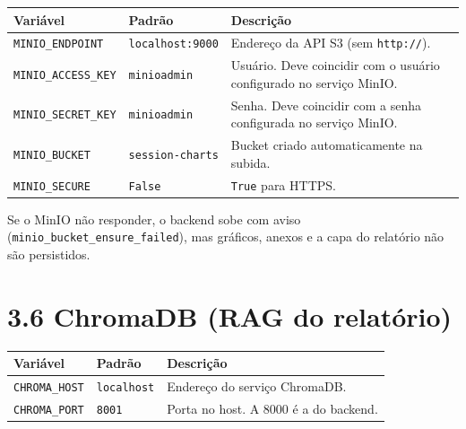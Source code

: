 \documentclass[
  brazilian,
  a4paper,12pt,oneside]{report}
\newcounter{none} %
\begin{document}
{\def\LTcaptype{none} %
\begin{longtable}[]{@{}
  >{\raggedright\arraybackslash}p{}
  >{\raggedright\arraybackslash}p{}
  >{\raggedright\arraybackslash}p{}@{}}
\toprule\noalign{}
\begin{minipage}[b]{\linewidth}\raggedright
Variável
\end{minipage} & \begin{minipage}[b]{\linewidth}\raggedright
Padrão
\end{minipage} & \begin{minipage}[b]{\linewidth}\raggedright
Descrição
\end{minipage} \\
\midrule\noalign{}
\endhead
\bottomrule\noalign{}
\endlastfoot
\texttt{MINIO\_}\allowbreak{}\texttt{ENDPOINT} &
\texttt{localhost:}\allowbreak{}\texttt{9000} & Endereço da API S3 (sem
\texttt{http:}\allowbreak{}\texttt{/}\allowbreak{}\texttt{/}). \\
\texttt{MINIO\_}\allowbreak{}\texttt{ACCESS\_}\allowbreak{}\texttt{KEY}
& \texttt{minioadmin} & Usuário. Deve coincidir com o usuário
configurado no serviço MinIO. \\
\texttt{MINIO\_}\allowbreak{}\texttt{SECRET\_}\allowbreak{}\texttt{KEY}
& \texttt{minioadmin} & Senha. Deve coincidir com a senha configurada no
serviço MinIO. \\
\texttt{MINIO\_}\allowbreak{}\texttt{BUCKET} &
\texttt{session-}\allowbreak{}\texttt{charts} & Bucket criado
automaticamente na subida. \\
\texttt{MINIO\_}\allowbreak{}\texttt{SECURE} & \texttt{False} &
\texttt{True} para HTTPS. \\
\end{longtable}
}

Se o MinIO não responder, o backend sobe com aviso
(\texttt{minio\_}\allowbreak{}\texttt{bucket\_}\allowbreak{}\texttt{ensure\_}\allowbreak{}\texttt{failed}),
mas gráficos, anexos e a capa do relatório não são persistidos.

\section{3.6 ChromaDB (RAG do
relatório)}\label{chromadb-rag-do-relatuxf3rio}

{\def\LTcaptype{none} %
\begin{longtable}[]{@{}lll@{}}
\toprule\noalign{}
Variável & Padrão & Descrição \\
\midrule\noalign{}
\endhead
\bottomrule\noalign{}
\endlastfoot
\texttt{CHROMA\_}\allowbreak{}\texttt{HOST} & \texttt{localhost} &
Endereço do serviço ChromaDB. \\
\texttt{CHROMA\_}\allowbreak{}\texttt{PORT} & \texttt{8001} & Porta no
host. A 8000 é a do backend. \\
\end{longtable}
}
\end{document}
